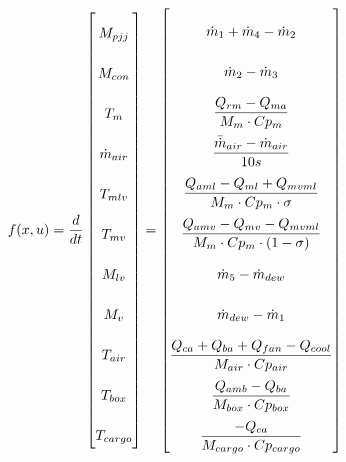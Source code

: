 \begin{equation} \label{eq:f_noSub} \renewcommand{\arraystretch}{2.4}
	f(x,u) =  \dfrac{d}{dt} \begin{bmatrix}
		M_{pjj}			\\				%
		M_{con} 		\\				%
		T_m 			\\				%
		\dot{m}_{air}	\\				%
		T_{mlv}			\\				%
		T_{mv}			\\				%
		M_{lv}			\\				%
		M_v				\\				%
		T_{air}			\\				%
		T_{box}			\\				%
		T_{cargo}		\\				%

	\end{bmatrix}
	=
	\begin{bmatrix}
		\dot{m}_1 + \dot{m}_4 - \dot{m}_2 \\										%
		\dot{m}_{2} - \dot{m}_{3}	\\												%
		\dfrac{Q_{rm} - Q_{ma}}{M_m \cdot Cp_m} \\									%
		\dfrac{\bar{\dot{m}}_{air}  - \dot{m}_{air}} {10s}		\\					%
		\dfrac{Q_{aml}-Q_{ml} + Q_{mvml}}{M_m \cdot Cp_m \cdot \sigma}        \\	%
		\dfrac{Q_{amv} - Q_{mv} - Q_{mvml}}{M_m \cdot Cp_m \cdot (1- \sigma)}	\\	%
		\dot{m}_{5} - \dot{m}_{dew}		\\											%
		\dot{m}_{dew} - \dot{m}_{1}	\\												%
		\dfrac{Q_{ca} + Q_{ba} + Q_{fan} -Q_{cool}}{M_{air} \cdot Cp_{air}} \\		%
		\dfrac{Q_{amb} - Q_{ba}}{M_{box} \cdot Cp_{box}} \\							%
		\dfrac{-Q_{ca}}{M_{cargo} \cdot Cp_{cargo}}									%
	\end{bmatrix}
\end{equation}


